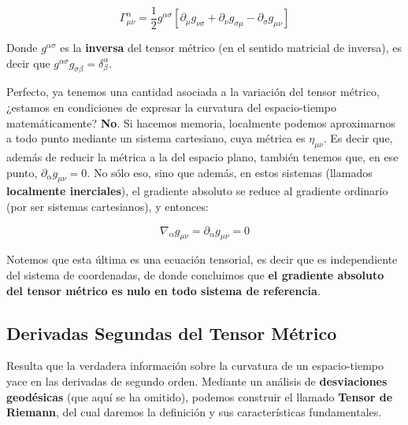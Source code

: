\begin{remarkbox}{}
\begin{equation}
    \Gamma^{\alpha}_{\mu \nu}=\frac{1}{2}g^{\alpha\sigma}\left[\partial_{\mu}g_{\nu\sigma}+\partial_{\nu}g_{\sigma \mu}-\partial_{\sigma}g_{\mu\nu}\right]
    \label{simboloChristoffel}
\end{equation}
\end{remarkbox}

Donde $g^{\alpha\sigma}$ es la \textbf{inversa} del tensor métrico (en el sentido matricial de inversa), es decir que $g^{\alpha\sigma}g_{\sigma\beta}=\delta^{\alpha}_\beta$.

\vspace{0.5cm}

Perfecto, ya tenemos una cantidad asociada a la variación del tensor métrico, ¿estamos en condiciones de expresar la curvatura del espacio-tiempo matemáticamente? \textbf{No}. Si hacemos memoria, localmente podemos aproximarnos a todo punto mediante un sistema cartesiano, cuya métrica es $\eta_{\mu\nu}$. Es decir que, además de reducir la métrica a la del espacio plano, también tenemos que, en ese punto, $\partial_\alpha g_{\mu\nu}=0$. No sólo eso, sino que además, en estos sistemas (llamados \textbf{localmente inerciales}), el gradiente absoluto se reduce al gradiente ordinario (por ser sistemas cartesianos), y entonces:

\begin{equation}
    \nabla_{\alpha}g_{\mu\nu}=\partial_\alpha g_{\mu\nu}=0
\end{equation}

Notemos que esta última es una ecuación tensorial, es decir que es independiente del sistema de coordenadas, de donde concluimos que \textbf{el gradiente absoluto del tensor métrico es nulo en todo sistema de referencia}.

\subsection*{\textbf{Derivadas Segundas del Tensor Métrico}}

Resulta que la verdadera información sobre la curvatura de un espacio-tiempo yace en las derivadas de segundo orden. Mediante un análisis de \textbf{desviaciones geodésicas}\cite[][p.211]{moore} (que aquí se ha omitido), podemos construir el llamado \textbf{Tensor de Riemann}, del cual daremos la definición y sus características fundamentales.

